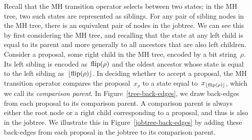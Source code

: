 \documentclass[angelino.tex]{subfiles}
\begin{document}
Recall that the MH transition operator selects between two states;
in the MH tree, two such states are represented as siblings.
For any pair of sibling nodes in the MH tree, there is an equivalent pair of
nodes in the jobtree.
We can see this by first considering the MH tree, and recalling that the state
at any left child is equal to its parent and more generally to all ancestors
that are also left children.
Consider a proposal, \ie some right child in the MH tree,
encoded by a bit string~$\rho$.
Its left sibling is encoded as~${\text{flip}(\rho)}$ and
the oldest ancestor whose state is equal to the left sibling 
as~${\lfloor{\text{flip}(\rho)}\rfloor}$.
In deciding whether to accept a proposal, the MH transition operator compares
the proposal~$x_\rho$ to a state equal to~$x_{\lfloor{\text{flip}(\rho)}\rfloor}$,
which we call its \emph{comparison parent}.
In Figure~\ref{tree-back-edges}, we draw back-edges from each proposal
to its comparison parent.
A comparison parent is always either the root node or a right child
corresponding to a proposal, and thus is also in the jobtree.
We illustrate this in Figure~\ref{jobtree-back-edges} by adding these
back-edges from each proposal in the jobtree to its comparison parent.
\end{document}
